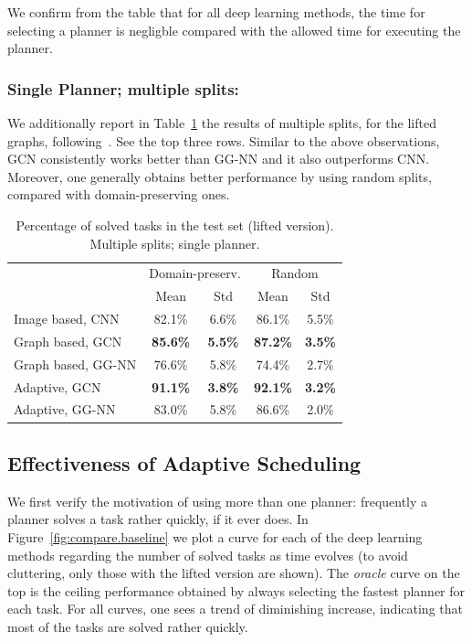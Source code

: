 \documentclass[letterpaper]{article} %
\begin{document}
We confirm from the table that for all deep learning methods, the time for selecting a planner is negligble compared with the allowed time for executing the planner.

\subsubsection{Single Planner; multiple splits:} We additionally report in Table~\ref{tab:perf.with.std} the results of multiple splits, for the lifted graphs, following~\cite{Sievers2019}. See the top three rows. Similar to the above observations, GCN consistently works better than GG-NN and it also outperforms CNN. Moreover, one generally obtains better performance by using random splits, compared with domain-preserving ones.


\begin{table}[ht]
\centering
\caption{Percentage of solved tasks in the test set (lifted version). Multiple splits; single planner.}
\label{tab:perf.with.std}
\begin{tabular}{lcccc}
\hline
& \multicolumn{2}{c}{Domain-preserv.} &
\multicolumn{2}{c}{Random}\\
& Mean & Std & Mean & Std\\
\hline
Image based, CNN   & 82.1\% & 6.6\% & 86.1\% & 5.5\%\\
Graph based, GCN   & \textbf{85.6\%} & \textbf{5.5\%} & \textbf{87.2\%} & \textbf{3.5\%}\\
Graph based, GG-NN & 76.6\% & 5.8\% & 74.4\% & 2.7\%\\
\hline
Adaptive, GCN      & \textbf{91.1\%} & \textbf{3.8\%} & \textbf{92.1\%} & \textbf{3.2\%}\\
Adaptive, GG-NN    & 83.0\% & 5.8\% & 86.6\% & 2.0\%\\
\hline
\end{tabular}
\end{table}


\subsection{Effectiveness of Adaptive Scheduling}
We first verify the motivation of using more than one planner: frequently a planner solves a task rather quickly, if it ever does. In Figure~\ref{fig:compare.baseline} we plot a curve for each of the deep learning methods regarding the number of solved tasks as time evolves (to avoid cluttering, only those with the lifted version are shown). The \emph{oracle} curve on the top is the ceiling performance obtained by always selecting the fastest planner for each task. For all curves, one sees a trend of diminishing increase, indicating that most of the tasks are solved rather quickly.
\end{document}
